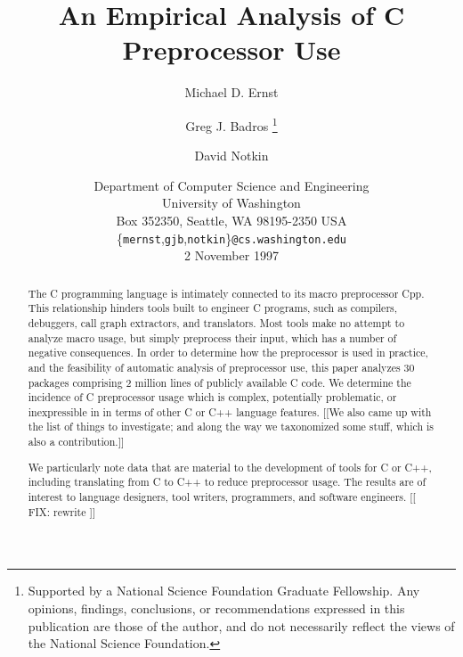 \documentclass[10pt]{article}
\def\numpackages{30}
\def\numlines{2 million}
\begin{document}
% 


\title{An Empirical Analysis of C Preprocessor Use}

\author{Michael D. Ernst%
  \and Greg J. Badros%
  \thanks{Supported by a National Science Foundation
    Graduate Fellowship. Any opinions, findings, conclusions, or
    recommendations expressed in this publication are those of the
    author, and do not necessarily reflect the views of the National
    Science Foundation.}
  \and David Notkin}

\date{%
Department of Computer Science and Engineering \\
University of Washington \\
Box 352350, Seattle, WA  98195-2350  USA \\
{\small \{{\tt mernst},{\tt gjb},{\tt notkin}\}{\tt @cs.washington.edu}} \\
2 November 1997}  

\maketitle

\begin{abstract}
  The C programming language is intimately connected to its macro
  preprocessor Cpp.  This relationship hinders tools built to engineer C
  programs, such as compilers, debuggers, call graph extractors, and
  translators.  Most tools make no attempt to analyze macro usage, but simply
  preprocess their input, which has a number of negative consequences.  In
  order to determine how the preprocessor is used in practice, and the
  feasibility of automatic analysis of preprocessor use, this paper
  analyzes {\numpackages} packages comprising {\numlines} lines of publicly
  available C code.  We determine the incidence of C preprocessor usage which
  is complex, potentially problematic, or inexpressible in in terms of
  other C or C++ language features.
[[We also came up with the list of things to investigate; and along the way
we taxonomized some stuff, which is also a contribution.]]

  We particularly note data that are
  material to the development of tools for C or C++, including translating
  from C to C++ to reduce preprocessor usage.  The results are of interest
  to language designers, tool writers, programmers, and software
  engineers.
[[ FIX: rewrite ]]
\end{abstract}
\end{document}
